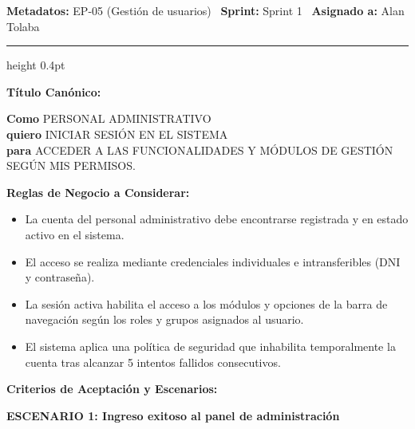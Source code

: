 \documentclass[a4paper,9pt]{article}
\begin{document}
\begin{tcolorbox}[hucard, title={\textbf{HU-52: INICIAR SESIÓN COMO ADMINISTRATIVO} \hfill \scriptsize \colorbox{slatestatus}{\textbf{\ Done\ }} \quad \colorbox{white}{\textcolor{primarydark}{\textbf{\ 2 pts\ }}}}]
\vspace{-1pt}
\noindent\textbf{\footnotesize Metadatos:} EP-05 (Gestión de usuarios) \textbar\ \textbf{Sprint:} Sprint 1 \textbar\ \textbf{Asignado a:} Alan Tolaba\par\vspace{2pt}
\hrule height 0.4pt\par\vspace{3pt}
\noindent\textbf{\footnotesize Título Canónico:}\par\vspace{1pt}
{\small \textbf{Como} PERSONAL ADMINISTRATIVO \\ \textbf{quiero} INICIAR SESIÓN EN EL SISTEMA \\ \textbf{para} ACCEDER A LAS FUNCIONALIDADES Y MÓDULOS DE GESTIÓN SEGÚN MIS PERMISOS.}\par\vspace{3pt}
\noindent\textbf{\footnotesize Reglas de Negocio a Considerar:}\par\vspace{1pt}
{\footnotesize
\begin{itemize}[leftmargin=12pt, nosep, itemsep=1.5pt, topsep=1pt]
\item La cuenta del personal administrativo debe encontrarse registrada y en estado activo en el sistema.
\item El acceso se realiza mediante credenciales individuales e intransferibles (DNI y contraseña).
\item La sesión activa habilita el acceso a los módulos y opciones de la barra de navegación según los roles y grupos asignados al usuario.
\item El sistema aplica una política de seguridad que inhabilita temporalmente la cuenta tras alcanzar 5 intentos fallidos consecutivos.
\end{itemize}
}\par\vspace{3pt}
\noindent\textbf{\footnotesize Criterios de Aceptación y Escenarios:}\par\vspace{2pt}
{\footnotesize
\noindent\textbf{\textcolor{secondarydark}{ESCENARIO 1:  Ingreso exitoso al panel de administración}}\par\vspace{1pt}
}
\end{tcolorbox}
\end{document}
